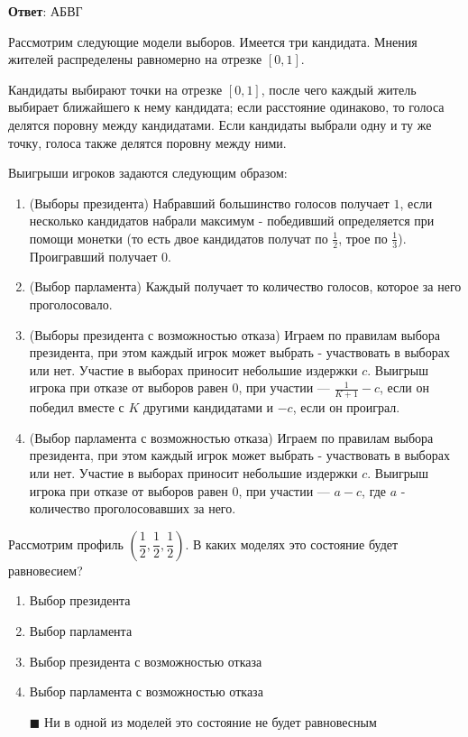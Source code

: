 \textbf{Ответ}: 
АБВГ  %

\solution %

\task
Рассмотрим следующие модели выборов. Имеется три кандидата. Мнения жителей распределены равномерно на отрезке $[0,1]$.

Кандидаты выбирают точки на отрезке $[0,1]$, после чего каждый житель выбирает ближайшего к нему кандидата; если расстояние одинаково, то голоса делятся поровну между кандидатами. Если кандидаты выбрали одну и ту же точку, голоса также делятся поровну между ними.

Выигрыши игроков задаются следующим образом:
\begin{enumerate}[label=--]
	\item (Выборы президента) Набравший большинство голосов получает $1$, если несколько кандидатов набрали максимум - победивший определяется при помощи монетки (то есть двое кандидатов получат по $\frac{1}{2}$, трое по $\frac{1}{3}$). Проигравший получает $0$.
	\item (Выбор парламента) Каждый получает то количество голосов, которое за него проголосовало.
	\item (Выборы президента с возможностью отказа) Играем по правилам выбора президента, при этом каждый игрок может выбрать - участвовать в выборах или нет. Участие в выборах приносит небольшие издержки $c$. Выигрыш игрока при отказе от выборов равен $0$, при участии --- $\frac{1}{K+1}-c$, если он победил вместе с $K$ другими кандидатами и $-c$, если он проиграл.
	\item (Выбор парламента с возможностью отказа) Играем по правилам выбора президента, при этом каждый игрок может выбрать - участвовать в выборах или нет. Участие в выборах приносит небольшие издержки $c$. Выигрыш игрока при отказе от выборов равен $0$, при участии --- $a-c$, где $a$ - количество проголосовавших за него.
\end{enumerate}

Рассмотрим профиль $\left(\dfrac{1}{2}, \dfrac{1}{2}, \dfrac{1}{2}\right)$. В каких моделях это состояние будет равновесием?
\begin{enumerate}[label=$\square$]
	\item Выбор президента %
	\item Выбор парламента
	\item Выбор президента с возможностью отказа
	\item Выбор парламента с возможностью отказа
	\item[$\blacksquare$] Ни в одной из моделей это состояние не будет равновесным
\end{enumerate}

